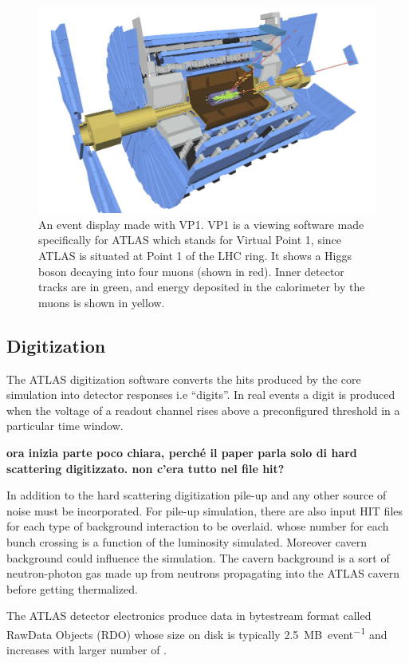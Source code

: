 \begin{figure}[tp]
\centering
\includegraphics[width=.75\textwidth]{MCSample/simulation}
\caption{An event display made with VP1. VP1 is a viewing software made specifically for ATLAS which stands for Virtual Point 1, since ATLAS is situated at Point 1 of the LHC ring. It shows a Higgs boson decaying into four muons (shown in red). Inner detector tracks are in green, and energy deposited in the calorimeter by the muons is shown in yellow.}
\label{fig:simulation}
\end{figure}

\subsection{Digitization}
The ATLAS digitization software converts the hits produced by the core simulation into detector responses i.e ``digits''. In real events a digit is produced when the voltage of a readout channel rises above a preconfigured threshold in a particular time window.

{\bfseries ora inizia parte poco chiara, perch\'e il paper parla solo di hard scattering digitizzato. non c'era tutto nel file hit?}

In addition to the hard scattering digitization pile-up and any other source of noise must be incorporated. For pile-up simulation, there are also input HIT files for each type of background interaction to be overlaid. whose number for each bunch crossing is a function of the luminosity simulated. Moreover cavern background could influence the simulation. The cavern background is a sort of neutron-photon gas made up from neutrons propagating into the ATLAS cavern before getting thermalized. 

The ATLAS detector electronics produce data in bytestream format called RawData Objects (RDO) whose size on disk is typically \SI{2.5}{MB\per event} and increases with larger number of \pileup.

